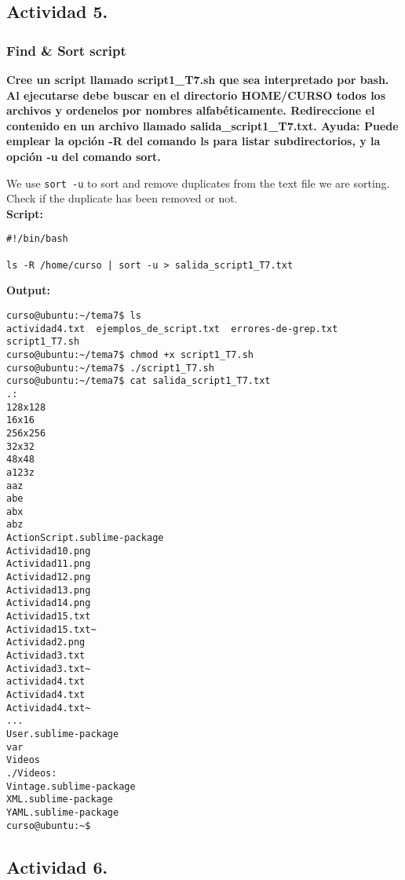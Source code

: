 \documentclass[a4paper,11pt,spanish]{article} %
\newenvironment{myscriptlisting}
{\begin{list}{}{\setlength{\leftmargin}{1em}}\item\scriptsize\bfseries}
{\end{list}}
\begin{document}
\subsection{Actividad 5.}

\subsubsection{Find \& Sort script}

\textbf{Cree un script llamado script1\_T7.sh que sea interpretado por bash. Al ejecutarse debe buscar en el
directorio HOME/CURSO todos los archivos y ordenelos por nombres alfabéticamente. 
Redireccione el contenido en un archivo llamado salida\_script1\_T7.txt.
Ayuda: Puede emplear la opción -R del comando ls para listar subdirectorios, y la opción -u del comando sort.}

We use \texttt{sort -u} to sort and remove duplicates from the text file we are sorting. 
Check if the duplicate has been removed or not.\\

\textbf{Script:}

\begin{myscriptlisting}
 \begin{verbatim} 
#!/bin/bash

ls -R /home/curso | sort -u > salida_script1_T7.txt
 \end{verbatim}
\end{myscriptlisting}

\textbf{Output:}

\begin{myscriptlisting}
 \begin{verbatim} 
curso@ubuntu:~/tema7$ ls
actividad4.txt  ejemplos_de_script.txt  errores-de-grep.txt  script1_T7.sh
curso@ubuntu:~/tema7$ chmod +x script1_T7.sh 
curso@ubuntu:~/tema7$ ./script1_T7.sh 
curso@ubuntu:~/tema7$ cat salida_script1_T7.txt 
.:
128x128
16x16
256x256
32x32
48x48
a123z
aaz
abe
abx
abz
ActionScript.sublime-package
Actividad10.png
Actividad11.png
Actividad12.png
Actividad13.png
Actividad14.png
Actividad15.txt
Actividad15.txt~
Actividad2.png
Actividad3.txt
Actividad3.txt~
actividad4.txt
Actividad4.txt
Actividad4.txt~
...
User.sublime-package
var
Videos
./Videos:
Vintage.sublime-package
XML.sublime-package
YAML.sublime-package
curso@ubuntu:~$ 
 \end{verbatim}
\end{myscriptlisting}


\subsection{Actividad 6.}
\end{document}

